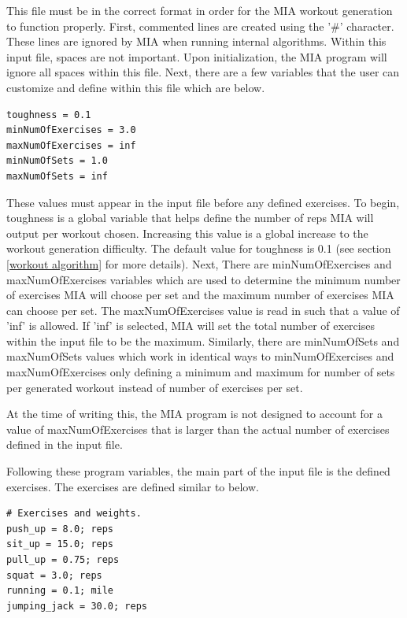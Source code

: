 This file must be in the correct format in order for the MIA workout generation to function properly. First, commented lines are created using the '\#' character. These lines are ignored by MIA when running internal algorithms. Within this input file, spaces are not important. Upon initialization, the MIA program will ignore all spaces within this file. Next, there are a few variables that the user can customize and define within this file which are below.

\begin{lstlisting}
toughness = 0.1
minNumOfExercises = 3.0
maxNumOfExercises = inf
minNumOfSets = 1.0
maxNumOfSets = inf
\end{lstlisting}

These values must appear in the input file before any defined exercises. To begin, toughness is a global variable that helps define the number of reps MIA will output per workout chosen. Increasing this value is a global increase to the workout generation difficulty. The default value for toughness is 0.1 (see section \ref{workout algorithm} for more details). Next, There are minNumOfExercises and maxNumOfExercises variables which are used to determine the minimum number of exercises MIA will choose per set and the maximum number of exercises MIA can choose per set. The maxNumOfExercises value is read in such that a value of 'inf' is allowed. If 'inf' is selected, MIA will set the total number of exercises within the input file to be the maximum. Similarly, there are minNumOfSets and maxNumOfSets values which work in identical ways to minNumOfExercises and maxNumOfExercises only defining a minimum and maximum for number of sets per generated workout instead of number of exercises per set. 

\begin{note}
	At the time of writing this, the MIA program is not designed to account for a value of maxNumOfExercises that is larger than the actual number of exercises defined in the input file.
\end{note}

Following these program variables, the main part of the input file is the defined exercises. The exercises are defined similar to below.

\begin{lstlisting}
# Exercises and weights.
push_up = 8.0; reps
sit_up = 15.0; reps
pull_up = 0.75; reps
squat = 3.0; reps
running = 0.1; mile
jumping_jack = 30.0; reps
\end{lstlisting}

